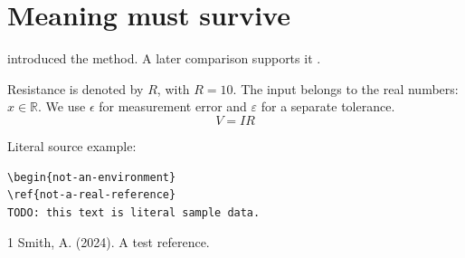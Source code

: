 \documentclass{article}
\begin{document}
\section{Meaning must survive}
\citet{smith2024} introduced the method.   
A later comparison supports it \citep{smith2024}.

Resistance is denoted by $R$, with $R=10$.
The input belongs to the real numbers: $x \in \mathbb{R}$.
We use $\epsilon$ for measurement error and $\varepsilon$ for a separate tolerance.
\begin{equation}
    V=IR   
\end{equation}

Literal source example:
\begin{verbatim}
\begin{not-an-environment}
\ref{not-a-real-reference}
TODO: this text is literal sample data.
\end{verbatim}

\begin{thebibliography}{1}
Smith, A. (2024). A test reference.
\end{thebibliography}
\end{document}
